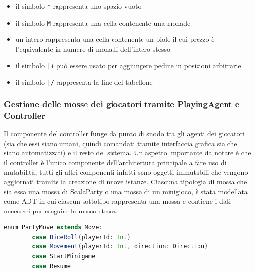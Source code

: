 \begin{itemize}
\begin{itemize}
        \item il simbolo \texttt{*} rappresenta uno spazio vuoto
        \item il simbolo \texttt{M} rappresenta una cella contenente una monade
        \item un intero rappresenta una cella contenente un piolo il cui prezzo è l'equivalente in numero di monadi dell'intero stesso
        \item il simbolo \texttt{|+} può essere usato per aggiungere pedine in posizioni arbitrarie
        \item il simbolo \texttt{|/} rappresenta la fine del tabellone
    \end{itemize}
\end{itemize}

\subsubsection{Gestione delle mosse dei giocatori tramite PlayingAgent e Controller}
Il componente del controller funge da punto di snodo tra gli agenti dei giocatori (sia che essi siano umani, quindi comandati tramite interfaccia grafica
sia che siano automatizzati) e il resto del sistema. Un aspetto importante da notare è che il controller è l'unico componente dell'architettura principale
a fare uso di mutabilità, tutti gli altri componenti infatti sono oggetti immutabili che vengono aggiornati tramite la creazione di nuove istanze. Ciascuna
tipologia di mossa che sia essa una mossa di ScalaParty o una mossa di un minigioco, è stata modellata come ADT in cui ciascun sottotipo rappresenta
una mossa e contiene i dati necessari per eseguire la mossa stessa.
    \begin{lstlisting}[language=Scala]
    enum PartyMove extends Move:
        case DiceRoll(playerId: Int)
        case Movement(playerId: Int, direction: Direction)
        case StartMinigame
        case Resume
    \end{lstlisting}

